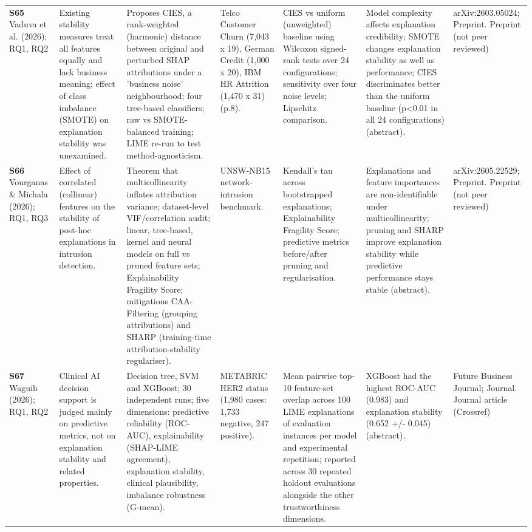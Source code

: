 \begin{longtable}{@{}P{1.55cm}P{2.9cm}P{4.5cm}P{3.2cm}P{3.4cm}P{4.6cm}P{3.6cm}@{}}
\textbf{S65} \cite{S65} Vaduva et al. (2026); RQ1, RQ2 & Existing stability measures treat all features equally and lack business meaning; effect of class imbalance (SMOTE) on explanation stability was unexamined. & Proposes CIES, a rank-weighted (harmonic) distance between original and perturbed SHAP attributions under a 'business noise' neighbourhood; four tree-based classifiers; raw vs SMOTE-balanced training; LIME re-run to test method-agnosticism. & Telco Customer Churn (7,043 x 19), German Credit (1,000 x 20), IBM HR Attrition (1,470 x 31) (p.8). & CIES vs uniform (unweighted) baseline using Wilcoxon signed-rank tests over 24 configurations; sensitivity over four noise levels; Lipschitz comparison. & Model complexity affects explanation credibility; SMOTE changes explanation stability as well as performance; CIES discriminates better than the uniform baseline (p\textless{}0.01 in all 24 configurations) (abstract). & arXiv:2603.05024; Preprint. Preprint (not peer reviewed) \\
\textbf{S66} \cite{S66} Vourganas \& Michala (2026); RQ1, RQ3 & Effect of correlated (collinear) features on the stability of post-hoc explanations in intrusion detection. & Theorem that multicollinearity inflates attribution variance; dataset-level VIF/\allowbreak{}correlation audit; linear, tree-based, kernel and neural models on full vs pruned feature sets; Explainability Fragility Score; mitigations CAA-Filtering (grouping attributions) and SHARP (training-time attribution-stability regulariser). & UNSW-NB15 network-intrusion benchmark. & Kendall's tau across bootstrapped explanations; Explainability Fragility Score; predictive metrics before/\allowbreak{}after pruning and regularisation. & Explanations and feature importances are non-identifiable under multicollinearity; pruning and SHARP improve explanation stability while predictive performance stays stable (abstract). & arXiv:2605.22529; Preprint. Preprint (not peer reviewed) \\
\textbf{S67} \cite{S67} Waguih (2026); RQ1, RQ2 & Clinical AI decision support is judged mainly on predictive metrics, not on explanation stability and related properties. & Decision tree, SVM and XGBoost; 30 independent runs; five dimensions: predictive reliability (ROC-AUC), explainability (SHAP-LIME agreement), explanation stability, clinical plausibility, imbalance robustness (G-mean). & METABRIC HER2 status (1,980 cases: 1,733 negative, 247 positive). & Mean pairwise top-10 feature-set overlap across 100 LIME explanations of evaluation instances per model and experimental repetition; reported across 30 repeated holdout evaluations alongside the other trustworthiness dimensions. & XGBoost had the highest ROC-AUC (0.983) and explanation stability (0.652 +/\allowbreak{}- 0.045) (abstract). & Future Business Journal; Journal. Journal article (Crossref) \\

\end{longtable}

